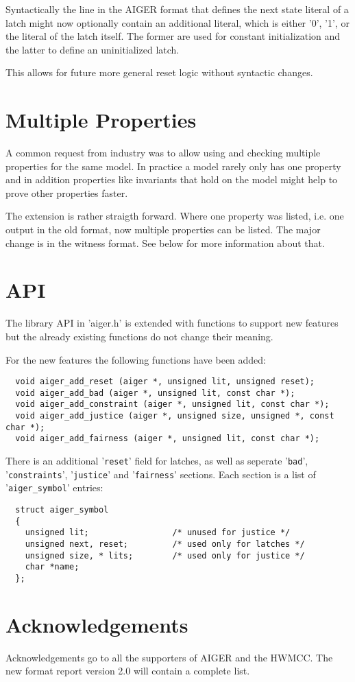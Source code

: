 \documentclass{llncs}
\begin{document}
Syntactically the line in the AIGER format that defines the next state
literal of a latch might now optionally contain an additional literal, which
is either '0', '1', or the literal of the latch itself.  The former are used
for constant initialization and the latter to define an uninitialized latch.

This allows for future more general reset logic without syntactic changes.

\section{Multiple Properties}

A common request from industry was to allow using and checking multiple
properties for the same model.  In practice a model rarely only has one
property and in addition properties like invariants that hold on the model
might help to prove other properties faster.

The extension is rather straigth forward.  Where one property was listed,
i.e. one output in the old format, now multiple properties can be listed.
The major change is in the witness format.  See below for more information
about that.

\section{API}

The library API in 'aiger.h' is extended with functions to support new
features but the already existing functions do not change their meaning.

For the new features the following functions have been added:
{\small
\begin{verbatim}
  void aiger_add_reset (aiger *, unsigned lit, unsigned reset);
  void aiger_add_bad (aiger *, unsigned lit, const char *);
  void aiger_add_constraint (aiger *, unsigned lit, const char *);
  void aiger_add_justice (aiger *, unsigned size, unsigned *, const char *);
  void aiger_add_fairness (aiger *, unsigned lit, const char *);
\end{verbatim}}

There is an additional '\texttt{reset}' field for latches, as well as 
seperate '\texttt{bad}', '\texttt{constraints}', '\texttt{justice}' and
'\texttt{fairness}' sections.  Each section
is a list of '\texttt{aiger\_symbol}' entries:

{\small
\begin{verbatim}
  struct aiger_symbol
  {
    unsigned lit;                 /* unused for justice */
    unsigned next, reset;         /* used only for latches */
    unsigned size, * lits;        /* used only for justice */
    char *name;
  };
\end{verbatim}}

\section{Acknowledgements}

Acknowledgements go to all the supporters of AIGER and the HWMCC.
The new format report version 2.0 will contain a complete list.
\end{document}
